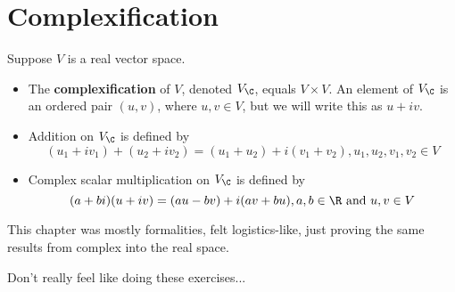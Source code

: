 \section{Complexification}

\begin{definition}
  Suppose $V$ is a real vector space.
  \begin{itemize}
    \item The \textbf{complexification} of $V$, denoted $V_{\C}$, equals $V \times V$. An element of $V_{\C}$ is an ordered pair $(u, v)$, where $u, v \in V$, but we will write this as $u+iv$.
    \item Addition on $V_{\C}$ is defined by
    \begin{equation}
      (u_1 + iv_1) + (u_2 + iv_2) = (u_1 + u_2) + i(v_1 + v_2), u_1, u_2, v_1, v_2 \in V
    \end{equation}
    \item Complex scalar multiplication on $V_{\C}$ is defined by
    \begin{equation}
      (a+bi)(u+iv) = (au-bv) + i(av+bu), a, b \in \R \text{ and } u, v \in V
    \end{equation}
  \end{itemize}
\end{definition}

This chapter was mostly formalities, felt logistics-like, just proving the same results from complex into the real space.

Don't really feel like doing these exercises...